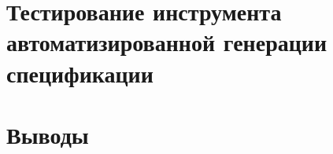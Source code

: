 \chapter{Тестирование инструмента автоматизированной генерации спецификации}

\blindtext

\chapter{Выводы}
